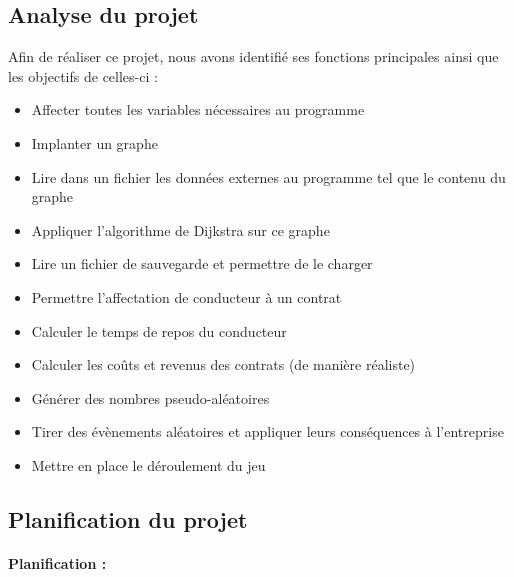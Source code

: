 \documentclass[a4paper, 12pt]{article}
\begin{document}
         
         
    \subsection{Analyse du projet}
        Afin de réaliser ce projet, nous avons identifié ses fonctions principales ainsi que les objectifs de celles-ci :

        \begin{itemize}
            \item Affecter toutes les variables nécessaires au programme
            \item Implanter un graphe
            \item Lire dans un fichier les données externes au programme tel que le contenu du graphe
            \item Appliquer l'algorithme de Dijkstra sur ce graphe
            \item Lire un fichier de sauvegarde et permettre de le charger
            \item Permettre l'affectation de conducteur à un contrat
            \item Calculer le temps de repos du conducteur
            \item Calculer les coûts et revenus des contrats (de manière réaliste)
            \item Générer des nombres pseudo-aléatoires
            \item Tirer des évènements aléatoires et appliquer leurs conséquences à l'entreprise
            \item Mettre en place le déroulement du jeu
            
       \end{itemize}
        \newpage
    \subsection{Planification du projet}
        \paragraph{Planification : \newline\newline}
    
\end{document}
